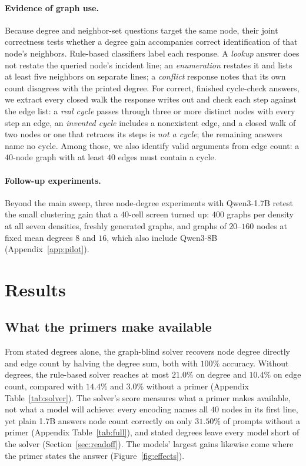 \documentclass[11pt]{article}
\begin{document}
\paragraph{Evidence of graph use.} Because degree and neighbor-set questions target the same node, their joint correctness tests whether a degree gain accompanies correct identification of that node's neighbors. Rule-based classifiers label each response. A \emph{lookup} answer does not restate the queried node's incident line; an \emph{enumeration} restates it and lists at least five neighbors on separate lines; a \emph{conflict} response notes that its own count disagrees with the printed degree. For correct, finished cycle-check answers, we extract every closed walk the response writes out and check each step against the edge list: a \emph{real cycle} passes through three or more distinct nodes with every step an edge, an \emph{invented cycle} includes a nonexistent edge, and a closed walk of two nodes or one that retraces its steps is \emph{not a cycle}; the remaining answers name no cycle. Among those, we also identify valid arguments from edge count: a $40$-node graph with at least $40$ edges must contain a cycle.

\paragraph{Follow-up experiments.} Beyond the main sweep, three node-degree experiments with Qwen3-1.7B retest the small clustering gain that a $40$-cell screen turned up: $400$ graphs per density at all seven densities, freshly generated graphs, and graphs of $20$--$160$ nodes at fixed mean degrees $8$ and $16$, which also include Qwen3-8B (Appendix~\ref{app:pilot}). %

\section{Results}
\label{sec:results}
\subsection{What the primers make available}
\label{sec:states}
From stated degrees alone, the graph-blind solver recovers node degree directly and edge count by halving the degree sum, both with $100\%$ accuracy. Without degrees, the rule-based solver reaches at most $21.0\%$ on degree and $10.4\%$ on edge count, compared with $14.4\%$ and $3.0\%$ without a primer (Appendix Table~\ref{tab:solver}). %
The solver's score measures what a primer makes available, not what a model will achieve: every encoding names all $40$ nodes in its first line, yet plain 1.7B answers node count correctly on only $31.50\%$ of prompts without a primer (Appendix Table~\ref{tab:full}), and stated degrees leave every model short of the solver (Section~\ref{sec:readoff}). %
The models' largest gains likewise come where the primer states the answer (Figure~\ref{fig:effects}).
\end{document}

